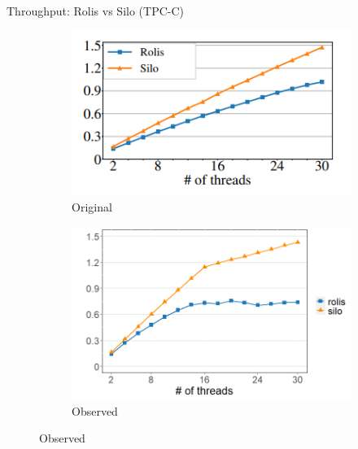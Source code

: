 \documentclass[xcolor=dvipsnames]{beamer}
\begin{document}
    \begin{frame}{Throughput: Rolis vs Silo (TPC-C)}   
        \begin{figure}
            \begin{subfigure}[h]{0.5\textwidth}
                \includegraphics[scale=0.65]{rolis_fig10_tpcc.png}
                \caption{Original}
            \end{subfigure}%
            \hfill
            \begin{subfigure}[h]{0.5\textwidth}
                \includegraphics[scale=0.30]{fig10_tpcc.png}
                \caption{Observed}
            \end{subfigure}
        \end{figure}
    \end{frame}
\end{document}
